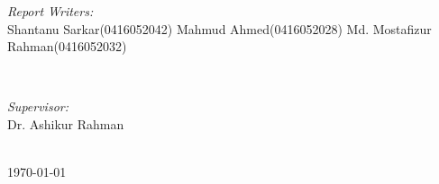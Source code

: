 \begin{titlepage}
\begin{minipage}{0.5\textwidth}
\begin{flushleft} \large
\emph{Report Writers:}\\
Shantanu Sarkar\newline(0416052042) \newline %
Mahmud Ahmed\newline(0416052028) \newline
Md. Mostafizur Rahman\newline(0416052032) 
\end{flushleft}
\end{minipage}
~
\begin{minipage}{0.4\textwidth}
\begin{flushright} \large
\emph{Supervisor:} \\
Dr. Ashikur  Rahman%
\end{flushright}
\end{minipage}\\[1cm]





{\large \today}\\[.5cm] %



 

\vfill %

\end{titlepage}

\tableofcontents

\newpage
\begin{abstract}

\end{abstract}

